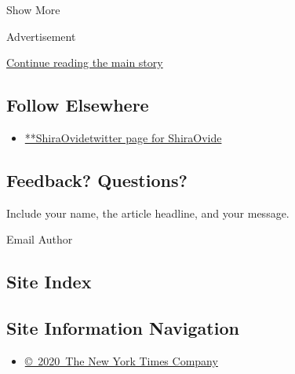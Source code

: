 Show More

Advertisement

\protect\hyperlink{after-mid2}{Continue reading the main story}

\hypertarget{follow-elsewhere}{%
\subsection{Follow Elsewhere}\label{follow-elsewhere}}

\begin{itemize}
\tightlist
\item
  \href{https://twitter.com/ShiraOvide}{**ShiraOvidetwitter page for
  ShiraOvide}
\end{itemize}

\hypertarget{feedback-questions}{%
\subsection{Feedback? Questions?}\label{feedback-questions}}

Include your name, the article headline, and your message.

Email Author

\hypertarget{site-index}{%
\subsection{Site Index}\label{site-index}}

\hypertarget{site-information-navigation}{%
\subsection{Site Information
Navigation}\label{site-information-navigation}}

\begin{itemize}
\tightlist
\item
  \href{https://help.nytimes3xbfgragh.onion/hc/en-us/articles/115014792127-Copyright-notice}{©~2020~The
  New York Times Company}
\end{itemize}

